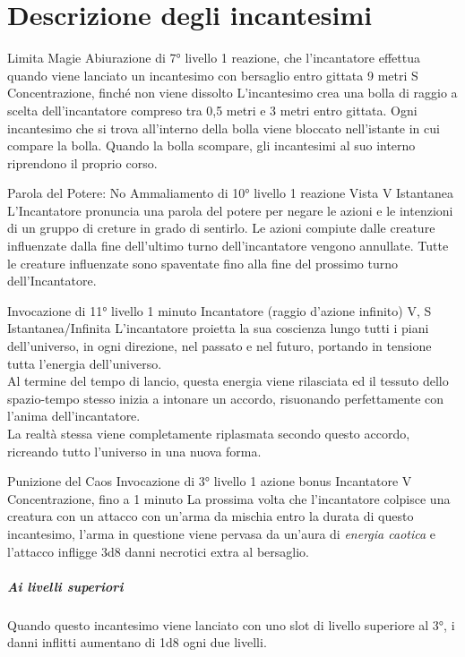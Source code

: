 \section{Descrizione degli incantesimi}

\DndSpellHeader%
  {Limita Magie}
  {Abiurazione di 7° livello}
  {1 reazione, che l'incantatore effettua quando viene lanciato un incantesimo con bersaglio entro gittata}
  {9 metri}
  {S}
  {Concentrazione, finché non viene dissolto}
L'incantesimo crea una bolla di raggio a scelta dell'incantatore compreso tra 0,5 metri e 3 metri entro gittata. Ogni incantesimo che si trova all'interno della bolla viene bloccato nell'istante in cui compare la bolla. Quando la bolla scompare, gli incantesimi al suo interno riprendono il proprio corso.

\DndSpellHeader%
  {Parola del Potere: No}
  {Ammaliamento di 10° livello}
  {1 reazione}
  {Vista}
  {V}
  {Istantanea}
L'Incantatore pronuncia una parola del potere per negare le azioni e le intenzioni di un gruppo di creture in grado di sentirlo.
Le azioni compiute dalle creature influenzate dalla fine dell'ultimo turno dell'incantatore vengono annullate.
Tutte le creature influenzate sono spaventate fino alla fine del prossimo turno dell'Incantatore.

{Invocazione di 11° livello}
{1 minuto}
{Incantatore (raggio d'azione infinito)}
{V, S}
{Istantanea/Infinita}
L'incantatore proietta la sua coscienza lungo tutti i piani dell'universo, in ogni direzione, nel passato e nel futuro, portando in tensione tutta l'energia dell'universo. \\ Al termine del tempo di lancio, questa energia viene rilasciata ed il tessuto dello spazio-tempo stesso inizia a intonare un accordo, risuonando perfettamente con l'anima dell'incantatore. \\ La realtà stessa viene completamente riplasmata secondo questo accordo, ricreando tutto l'universo in una nuova forma.

\DndSpellHeader%
  {Punizione del Caos}
  {Invocazione di 3° livello}
  {1 azione bonus}
  {Incantatore}
  {V}
  {Concentrazione, fino a 1 minuto}
La prossima volta che l'incantatore colpisce una creatura con un attacco con un'arma da mischia entro la durata di questo incantesimo, l'arma in questione viene pervasa da un'aura di \textit{energia caotica} e l'attacco infligge 3d8 danni necrotici extra al bersaglio. 
\subparagraph{Ai livelli superiori}Quando questo incantesimo viene lanciato con uno slot di livello superiore al 3°, i danni inflitti aumentano di 1d8 ogni due livelli.

